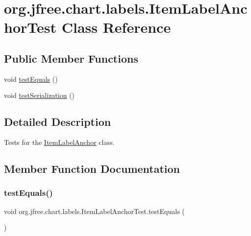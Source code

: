 \hypertarget{classorg_1_1jfree_1_1chart_1_1labels_1_1_item_label_anchor_test}{}\section{org.\+jfree.\+chart.\+labels.\+Item\+Label\+Anchor\+Test Class Reference}
\label{classorg_1_1jfree_1_1chart_1_1labels_1_1_item_label_anchor_test}
\subsection*{Public Member Functions}
\begin{DoxyCompactItemize}
\item 
void \mbox{\hyperlink{classorg_1_1jfree_1_1chart_1_1labels_1_1_item_label_anchor_test_a7234eea10cbf872b19d676403d62e82f}{test\+Equals}} ()
\item 
void \mbox{\hyperlink{classorg_1_1jfree_1_1chart_1_1labels_1_1_item_label_anchor_test_a9f9d6a896987a064dc2a0456fb8f4275}{test\+Serialization}} ()
\end{DoxyCompactItemize}


\subsection{Detailed Description}
Tests for the \mbox{\hyperlink{classorg_1_1jfree_1_1chart_1_1labels_1_1_item_label_anchor}{Item\+Label\+Anchor}} class. 

\subsection{Member Function Documentation}
\mbox{\label{classorg_1_1jfree_1_1chart_1_1labels_1_1_item_label_anchor_test_a7234eea10cbf872b19d676403d62e82f}} 
\subsubsection{\texorpdfstring{test\+Equals()}{testEquals()}}
{\footnotesize\ttfamily void org.\+jfree.\+chart.\+labels.\+Item\+Label\+Anchor\+Test.\+test\+Equals (\begin{DoxyParamCaption}{ }\end{DoxyParamCaption})}

